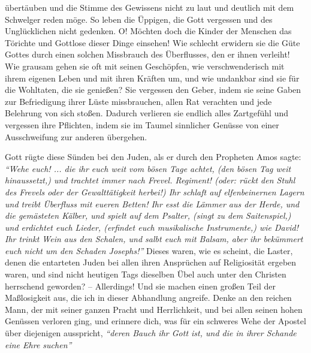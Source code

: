 übertäuben und die
Stimme des Gewissens nicht zu laut und deutlich mit
dem Schwelger
reden möge. So
leben die Üppigen, die Gott vergessen und des Unglücklichen nicht gedenken. O!
Möchten doch die Kinder der Menschen das Törichte und Gottlose dieser Dinge
einsehen! Wie schlecht erwidern sie die Güte Gottes durch einen solchen
Missbrauch des Überflusses, den er ihnen verleiht! Wie grausam gehen sie oft
mit seinen Geschöpfen, wie verschwenderisch mit ihrem
eigenen Leben und mit
ihren Kräften um, und wie undankbar sind sie für die Wohltaten,
die sie
genießen? Sie vergessen den Geber, indem sie seine Gaben zur Befriedigung ihrer
Lüste missbrauchen, allen Rat verachten und jede Belehrung von sich stoßen.
Dadurch verlieren sie endlich alles Zartgefühl und vergessen ihre
Pflichten,
indem sie im Taumel sinnlicher Genüsse von einer Ausschweifung zur anderen
übergehen.

\medskip

Gott rügte diese Sünden bei den Juden, als er durch den
Propheten Amos sagte:
\textit{"`Wehe euch! ... die ihr euch weit vom bösen Tage achtet, (den bösen Tag
weit
hinaussetzt,) und trachtet immer nach Frevel. Regiment! (oder: rückt den Stuhl
des Frevels oder der Gewalttätigkeit herbei!) Ihr schlaft auf elfenbeinernen
Lagern und treibt Überfluss mit eueren Betten! Ihr esst die Lämmer aus der
Herde, und die gemästeten Kälber, und spielt auf dem Psalter, (singt zu dem
Saitenspiel,) und erdichtet euch Lieder, (erfindet euch musikalische
Instrumente,) wie David! Ihr trinkt Wein aus den Schalen, und salbt euch mit
Balsam, aber ihr bekümmert euch nicht um den Schaden Josephs!"'}
Dieses waren, wie es scheint, die Laster, denen die entarteten
Juden bei allen ihren Ansprüchen auf
Religiosität ergeben waren,
und sind nicht
heutigen Tags dieselben Übel auch unter den Christen
herrschend geworden? --
Allerdings! Und sie machen einen großen Teil der
Maßlosigkeit aus, die ich in
dieser Abhandlung angreife. Denke an den reichen Mann, der mit seiner ganzen
Pracht und Herrlichkeit, und bei allen seinen hohen Genüssen verloren ging, und
erinnere dich, was für ein schweres Wehe der Apostel über diejenigen ausspricht,
\textit{"`deren Bauch ihr Gott ist, und die in ihrer Schande eine Ehre
suchen"'}

